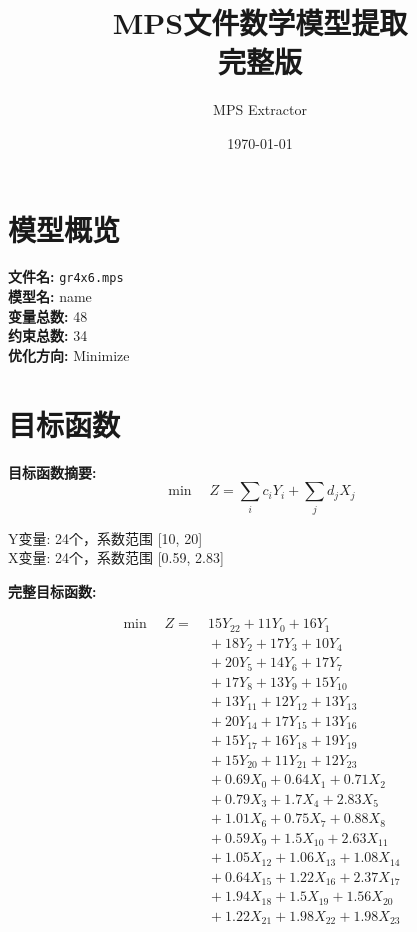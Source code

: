 \documentclass[a4paper,10pt]{article}
\title{MPS文件数学模型提取\\{\large 完整版}}
\author{MPS Extractor}
\date{\today}
\begin{document}
\maketitle
\tableofcontents
\newpage

\section{模型概览}

\textbf{文件名:} \texttt{gr4x6.mps} \\
\textbf{模型名:} name \\
\textbf{变量总数:} 48 \\
\textbf{约束总数:} 34 \\
\textbf{优化方向:} Minimize \\

\section{目标函数}

\textbf{目标函数摘要:}
\begin{equation}
\min \quad Z = \sum_{i} c_i Y_i + \sum_{j} d_j X_j
\end{equation}

Y变量: 24个，系数范围 [10, 20] \\
X变量: 24个，系数范围 [0.59, 2.83]

\textbf{完整目标函数:}

\allowdisplaybreaks
{\small
\begin{align}
\min \quad Z = &\; 15 Y_{22} + 11 Y_{0} + 16 Y_{1} \\[0.3ex]
&\;  + 18 Y_{2} + 17 Y_{3} + 10 Y_{4} \\[0.3ex]
&\;  + 20 Y_{5} + 14 Y_{6} + 17 Y_{7} \\[0.3ex]
&\;  + 17 Y_{8} + 13 Y_{9} + 15 Y_{10} \\[0.3ex]
&\;  + 13 Y_{11} + 12 Y_{12} + 13 Y_{13} \\[0.3ex]
&\;  + 20 Y_{14} + 17 Y_{15} + 13 Y_{16} \\[0.3ex]
&\;  + 15 Y_{17} + 16 Y_{18} + 19 Y_{19} \\[0.3ex]
&\;  + 15 Y_{20} + 11 Y_{21} + 12 Y_{23} \\[0.3ex]
&\;  + 0.69 X_{0} + 0.64 X_{1} + 0.71 X_{2} \\[0.3ex]
&\;  + 0.79 X_{3} + 1.7 X_{4} + 2.83 X_{5} \\[0.5ex]\allowbreak
&\;  + 1.01 X_{6} + 0.75 X_{7} + 0.88 X_{8} \\[0.3ex]
&\;  + 0.59 X_{9} + 1.5 X_{10} + 2.63 X_{11} \\[0.3ex]
&\;  + 1.05 X_{12} + 1.06 X_{13} + 1.08 X_{14} \\[0.3ex]
&\;  + 0.64 X_{15} + 1.22 X_{16} + 2.37 X_{17} \\[0.3ex]
&\;  + 1.94 X_{18} + 1.5 X_{19} + 1.56 X_{20} \\[0.3ex]
&\;  + 1.22 X_{21} + 1.98 X_{22} + 1.98 X_{23}\nonumber
\end{align}
}
\end{document}
